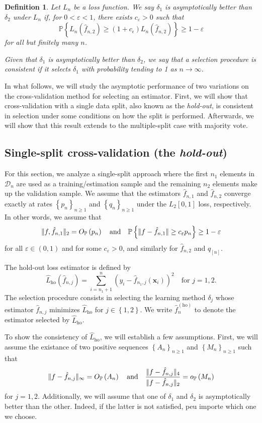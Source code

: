 \documentclass[11pt, letter paper]{article}
\newcommand{\1}{\mathmybb{1}}
\newtheorem{definition}{Definition}[section]
\newcommand{\0}{\emptyset}
\newcommand{\prob}{\mathbb{P}}
\newcommand{\paren}[1]{\left(#1 \right)}
\newcommand{\set}[1]{\left\{ #1 \right\}}
\newcommand{\norm}[1]{|\hspace{-1pt}|#1 |\hspace{-1pt}|}
\newcommand{\data}{\mathcal{D}_{n}}
\newcommand{\x}{\boldsymbol{x}}
\newcommand{\Loss}[1]{L_{n}\paren{#1}}
\newcommand{\ho}{\hat{L}_{\mathrm{ho}}}
\newcommand{\op}[1]{o_{\prob}\paren{#1}}
\newcommand{\Op}[1]{O_{\prob}\paren{#1}}
\newcommand{\fhat}[2]{\hat{f}_{#1, #2}}
\newcommand{\fho}{\hat{f}^{(\mathrm{ho})}_{n}}
\begin{document}
\begin{definition}
    Let \(L_{n}\) be a loss function. We say \(\delta_{1}\) is \emph{asymptotically better} than \(\delta_{2}\) under \(L_{n}\) if, for \(0<\varepsilon<1\), there exists \(c_{\varepsilon}>0\) such that
    \[\prob\set{\Loss{\fhat{n}{2}}\geq (1+c_{\epsilon})\Loss{\fhat{n}{2}} }\geq 1-\varepsilon\]
    for all but finitely many \(n\).

    Given that \(\delta_{1}\) is asymptotically better than \(\delta_{2}\), we say that a selection procedure is consistent if it selects \(\delta_{1}\) with probability tending to 1 as \(n\to\infty\).
\end{definition}

In what follows, we will study the asymptotic performance of two variations on the cross-validation method for selecting an estimator. First, we will show that cross-validation with a single data split, also known as the \emph{hold-out}, is consistent in selection under some conditions on how the split is performed. Afterwards, we will show that this result extends to the multiple-split case with majority vote.

\subsection{Single-split cross-validation (the \emph{hold-out})}

For this section, we analyze a single-split approach where the first \(n_1\) elements in \(\data\) are used as a training/estimation sample and the remaining \(n_2\) elements make up the validation sample. We assume that the estimators \(\fhat{n}{1}\) and \(\fhat{n}{2}\) converge exactly at rates \(\set{p_{n}}_{n\geq 1}\) and \(\set{q_{n}}_{n\geq 1}\) under the \(L_{2}[0,1]\) loss, respectively. In other words, we assume that
\[\norm{f, \fhat{n}{1}}_{2} = \Op{p_{n}} \quad\text{and}\quad \prob\set{\norm{f-\fhat{n}{1}} \geq c_{\varepsilon}p_{n}} \geq 1-\varepsilon\]
for all \(\varepsilon\in(0,1)\) and for some \(c_{\varepsilon}>0\), and similarly for \(\fhat{n}{2}\) and \(q_[n]\).

The hold-out loss estimator is defined by
\[\ho(\fhat{n}{j}) = \sum_{i=n_{1}+1}^{n}\paren{y_{i} - \fhat{n_{1}}{j}(\x_{i})}^{2}\quad\text{for }j=1,2.\]
The selection procedure consists in selecting the learning method \(\delta_{j}\) whose estimator \(\fhat{n}{j}\) minimizes \(\ho\) for \(j\in\set{1,2}\). We write \(\fho\) to denote the estimator selected by \(\ho\).

To show the consistency of \(\ho\), we will establish a few assumptions. First, we will assume the existance of two positive sequences \(\set{A_{n}}_{n\geq1}\) and \(\set{M_{n}}_{n\geq1}\) such that 
\[\norm{f-\fhat{n}{j}}_{\infty} = \Op{A_{n}}\quad\text{and}\quad\frac{\norm{f-\fhat{n}{j}}_{4}}{\norm{f-\fhat{n}{j}}_{2}} = \op{M_{n}}\]
for \(j=1,2\). Additionally, we will assume that one of \(\delta_{1}\) and \(\delta_{2}\) is asymptotically better than the other. Indeed, if the latter is not satisfied, peu importe which one we choose.
\end{document}
